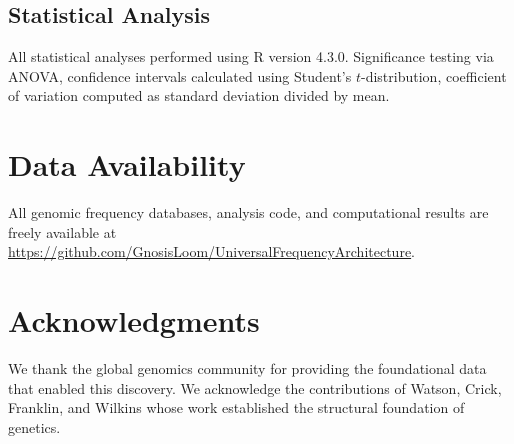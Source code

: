 \documentclass[9pt,twocolumn,twoside,lineno]{pnas-new}
\begin{document}
\subsection*{Statistical Analysis}
All statistical analyses performed using R version 4.3.0. Significance testing via ANOVA, confidence intervals calculated using Student's $t$-distribution, coefficient of variation computed as standard deviation divided by mean.

\section*{Data Availability}
All genomic frequency databases, analysis code, and computational results are freely available at \url{https://github.com/GnosisLoom/UniversalFrequencyArchitecture}.

\section*{Acknowledgments}
We thank the global genomics community for providing the foundational data that enabled this discovery. We acknowledge the contributions of Watson, Crick, Franklin, and Wilkins whose work established the structural foundation of genetics.


\end{document}

